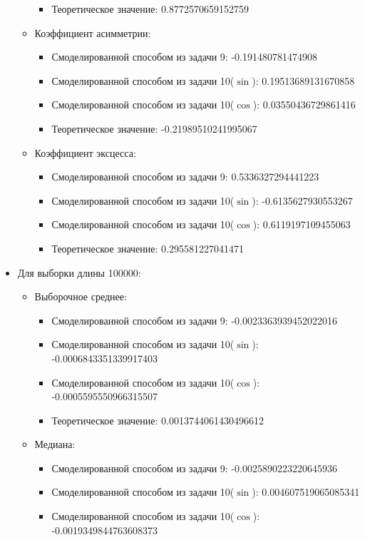 \documentclass{article}
\begin{document}
\begin{itemize}
\begin{itemize}
\begin{itemize}
			\item Теоретическое значение: 0.8772570659152759
		\end{itemize}
		\item Коэффициент асимметрии:
		\begin{itemize}
			\item Смоделированной способом из задачи 9: -0.191480781474908
			\item Смоделированной способом из задачи 10($\sin$): 0.19513689131670858
			\item Смоделированной способом из задачи 10($\cos$): 0.03550436729861416
			\item Теоретическое значение: -0.21989510241995067
		\end{itemize}
		\item Коэффициент эксцесса:
		\begin{itemize}
			\item Смоделированной способом из задачи 9: 0.5336327294441223
			\item Смоделированной способом из задачи 10($\sin$): -0.6135627930553267
			\item Смоделированной способом из задачи 10($\cos$): 0.6119197109455063
			\item Теоретическое значение: 0.295581227041471
		\end{itemize}
	\end{itemize}
\item Для выборки длины 100000:
\begin{itemize}
	\item Выборочное среднее:
	\begin{itemize}
		\item Смоделированной способом из задачи 9: -0.0023363939452022016
		\item Смоделированной способом из задачи 10($\sin$): -0.0006843351339917403
		\item Смоделированной способом из задачи 10($\cos$): -0.0005595550966315507
		\item Теоретическое значение: 0.0013744061430496612
	\end{itemize}
	\item Медиана:
	\begin{itemize}
		\item Смоделированной способом из задачи 9: -0.0025890223220645936
		\item Смоделированной способом из задачи 10($\sin$): 0.004607519065085341
		\item Смоделированной способом из задачи 10($\cos$): -0.0019349844763608373

\end{itemize}
\end{itemize}
\end{itemize}
\end{document}
